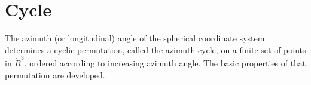 %
%
%






\section{Cycle}


The azimuth (or longitudinal) angle of the
spherical coordinate system determines a cyclic permutation,
called the azimuth cycle, on a finite set of points in $\ring{R}^3$, 
ordered according to increasing azimuth angle.  The basic
properties of that permutation are developed. 
%
%
%


